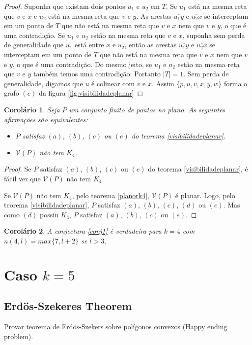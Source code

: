 \documentclass[a4paper]{book}
\newtheorem{corolario}{Corolário}[teorema]
\begin{document}
\begin{proof}
Suponha que existam dois pontos $u_1$ e $u_2$ em $T$. Se $u_1$ está na mesma reta que $v$ e $x$ e $u_2$ está na mesma reta que $v$ e $y$. As arestas $\overline{u_1y}$ e $\overline{u_2x}$ se interceptam em um ponto de $T$ que não está na mesma reta que $v$ e $x$ nem que $v$ e $y$, o que é uma contradição. Se $u_1$ e $u_2$ estão na mesma reta que $v$ e $x$, suponha sem perda de generalidade que $u_1$ está entre $x$ e $u_2$, então as arestas $\overline{u_1y}$ e $\overline{u_2x}$ se interceptam em um ponto de $T$ que não está na mesma reta que $v$ e $x$ nem que $v$ e $y$, o que é uma contradição. Do mesmo jeito, se $u_1$ e $u_2$ estão na mesma reta que $v$ e $y$ também temos uma contradição. Portanto $|T|=1$. Sem perda de generalidade, digamos que $u$ é colinear com $v$ e $x$. Assim $\{p,u,v,x,y,w\}$ forma o grafo $(e)$ da figura \ref{fig:visibilidadeplanar}
\end{proof}
\begin{corolario}
    Seja $P$ um conjunto finito de pontos no plano. As seguintes afirmações são equivalentes:
    \begin{itemize}
        \item
            $P$ satisfaz $(a)$, $(b)$, $(c)$ ou $(e)$ do teorema \ref{visibilidadeplanar}.
        \item
            $\mathcal V(P)$ não tem $K_4$.
    \end{itemize}
\end{corolario}
\begin{proof}
Se $P$ satisfaz $(a)$, $(b)$, $(c)$ ou $(e)$ do teorema \ref{visibilidadeplanar}, é fácil ver que $\mathcal V(P)$ não tem $K_4$.

Se $\mathcal V(P)$ não tem $K_4$, pelo teorema \ref{planork4}, $\mathcal V(P)$ é planar. Logo, pelo teorema \ref{visibilidadeplanar}, $P$ satisfaz $(a)$, $(b)$, $(c)$, $(d)$ ou $(e)$. Mas como $(d)$ possiu $K_4$, $P$ satisfaz $(a)$, $(b)$, $(c)$ ou $(e)$.
\end{proof}

\begin{corolario}
    A conjectura \ref{conj1} é verdadeira para $k=4$ com $n(4,l)=max\{7,l+2\}$ se $l>3$.
\end{corolario}

\section{Caso $k=5$}
\subsection{Erdös-Szekeres Theorem}
Provar teorema de Erdös-Szekers sobre polígonos convexos (Happy ending problem).
\cite{pentagon}
\end{document}
